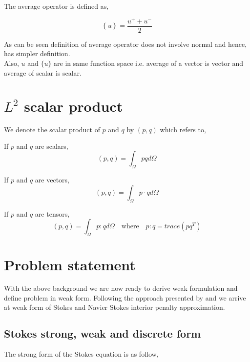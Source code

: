 \documentclass[a4paper]{book}
\begin{document}
The average operator is defined as,

\begin{equation}\label{average operator}
\left\lbrace u \right\rbrace = \frac{u^+ + u^-}{2}  
\end{equation} 

As can be seen definition of average operator does not involve normal and hence, has simpler definition.\\
Also, $u$ and $\lbrace u \rbrace$ are in same function space i.e. average of a vector is vector and average of scalar is scalar.\\

\section{$L^2$ scalar product}

We denote the scalar product of $p$ and $q$ by $(p,q)$ which refers to,

If $p$ and $q$ are scalars,
\begin{equation}\label{inner product scalars}
(p,q)=\int_{\Omega} pq d \Omega 
\end{equation}

If $p$ and $q$ are vectors,
\begin{equation}\label{Inner product vectors}
(p,q)=\int_{\Omega} p \cdot q d\Omega
\end{equation}

If $p$ and $q$ are tensors,
\begin{equation}\label{Inner product tensors}
(p,q)=\int_{\Omega} p:q d\Omega \quad \textrm{where} \quad p:q = trace(pq^T)
\end{equation}

\section{Problem statement}

With the above background we are now ready to derive weak formulation and define problem in weak form. Following the approach presented by \cite{Montlaur} and \cite{Montlaur2} we arrive at weak form of Stokes and Navier Stokes interior penalty approximation.

\subsection{Stokes strong, weak and discrete form} \label{Stokes_flow_ch3}

The strong form of the Stokes equation is as follow,
\end{document}
